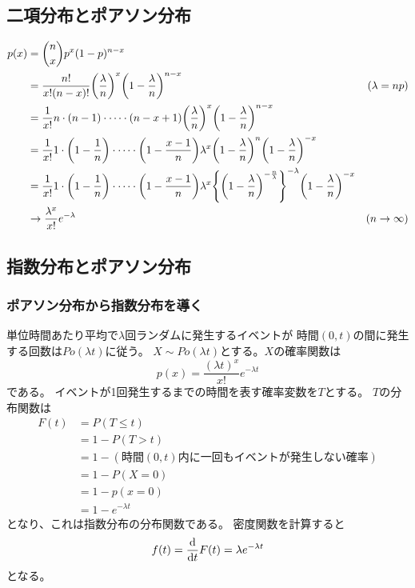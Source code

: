 \subsection{二項分布とポアソン分布}

\begin{equation}
  \begin{aligned}
    p(x) &= \binom{n}{x} p^{x} (1 - p)^{n -x} \\
    &= \frac{n!}{x! (n - x)!} \qty (\frac{\lambda}{n})^{x} \qty (1 - \frac{\lambda}{n})^{n - x}  & (\lambda = np) \\
    &= \frac{1}{x!} n \cdot (n - 1) \cdot \dots \cdot (n - x + 1) \qty (\frac{\lambda}{n})^{x} \qty (1 - \frac{\lambda}{n})^{n - x} \\
    &= \frac{1}{x!} 1 \cdot \qty(1 - \frac{1}{n}) \cdot \dots \cdot \qty (1 - \frac{x - 1}{n})
    \lambda^{x} \qty (1 - \frac{\lambda}{n})^{n}  \qty (1 - \frac{\lambda}{n})^{-x} \\
    &= \frac{1}{x!} 1 \cdot \qty(1 - \frac{1}{n}) \cdot \dots \cdot \qty (1 - \frac{x - 1}{n})
    \lambda^{x} \qty { \qty (1 - \frac{\lambda}{n})^{-\frac{n}{\lambda}} }^{- \lambda} \qty (1 - \frac{\lambda}{n})^{-x} \\
    &\rightarrow \frac{\lambda^x}{x!}e^{-\lambda} & (n \rightarrow \infty)
  \end{aligned}
\end{equation}

\subsection{指数分布とポアソン分布}

\subsubsection{ポアソン分布から指数分布を導く}

単位時間あたり平均で\(\lambda\)回ランダムに発生するイベントが
時間\((0, t)\)の間に発生する回数は\(Po(\lambda t)\)に従う。
\(X \sim Po(\lambda t)\)とする。\(X\)の確率関数は
\begin{equation}
  p(x) = \frac{(\lambda t)^x}{x!}e^{-\lambda t}
\end{equation}
である。
イベントが1回発生するまでの時間を表す確率変数を\(T\)とする。
\(T\)の分布関数は
\begin{equation}
  \begin{aligned}
    F(t) &= P(T \leq t) \\
    &= 1 - P(T > t) \\
    &= 1 - (時間(0, t)内に一回もイベントが発生しない確率) \\
    &= 1 - P(X = 0) \\
    &= 1 - p(x=0) \\
    &= 1 - e^{-\lambda t}
  \end{aligned}
\end{equation}
となり、これは指数分布の分布関数である。
密度関数を計算すると
\begin{equation}
  f(t) = \dv{t} F(t) = \lambda e^{- \lambda t}
\end{equation}
となる。


